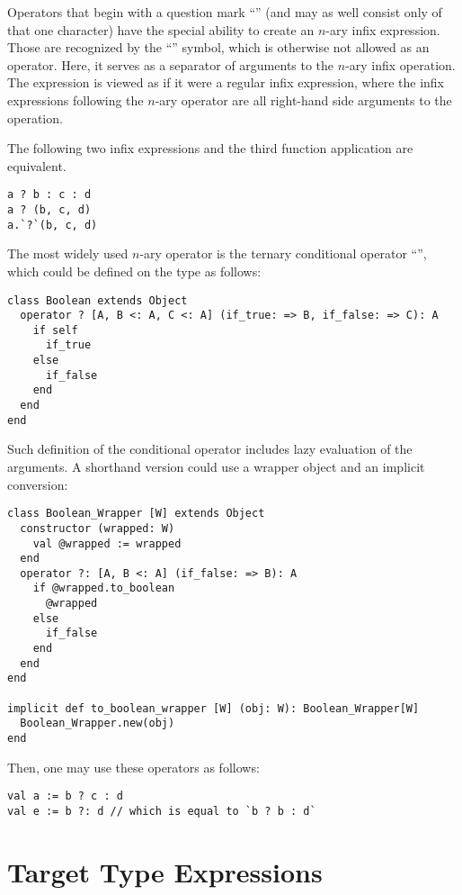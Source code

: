 Operators that begin with a question mark ``'' (and may as well consist only of that one character) have the special ability to create an $n$-ary infix expression. Those are recognized by the ``\code{:}'' symbol, which is otherwise not allowed as an operator. Here, it serves as a separator of arguments to the $n$-ary infix operation. The expression is viewed as if it were a regular infix expression, where the infix expressions following the $n$-ary operator are all right-hand side arguments to the operation. 

The following two infix expressions and the third function application are equivalent.
\begin{lstlisting}
a ? b : c : d
a ? (b, c, d)
a.`?`(b, c, d)
\end{lstlisting}

\example The most widely used $n$-ary operator is the ternary conditional operator ``'', which could be defined on the  type as follows:

\begin{lstlisting}
class Boolean extends Object
  operator ? [A, B <: A, C <: A] (if_true: => B, if_false: => C): A
    if self
      if_true
    else
      if_false
    end
  end
end
\end{lstlisting}

Such definition of the conditional operator includes lazy evaluation of the arguments. A shorthand version could use a wrapper object and an implicit conversion:

\begin{lstlisting}
class Boolean_Wrapper [W] extends Object
  constructor (wrapped: W)
    val @wrapped := wrapped
  end
  operator ?: [A, B <: A] (if_false: => B): A
    if @wrapped.to_boolean
      @wrapped
    else
      if_false
    end
  end
end

implicit def to_boolean_wrapper [W] (obj: W): Boolean_Wrapper[W]
  Boolean_Wrapper.new(obj)
end
\end{lstlisting}

Then, one may use these operators as follows: 

\begin{lstlisting}
val a := b ? c : d
val e := b ?: d // which is equal to `b ? b : d`
\end{lstlisting}




\section{Target Type Expressions}
\label{sec:target-type-expressions}

